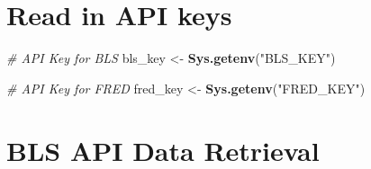 \documentclass[
]{article}
\newenvironment{Shaded}{\begin{snugshade}}{\end{snugshade}}
\newcommand{\CommentTok}[1]{\textcolor[rgb]{0.56,0.35,0.01}{\textit{#1}}}
\newcommand{\FunctionTok}[1]{\textcolor[rgb]{0.13,0.29,0.53}{\textbf{#1}}}
\newcommand{\NormalTok}[1]{#1}
\newcommand{\OtherTok}[1]{\textcolor[rgb]{0.56,0.35,0.01}{#1}}
\newcommand{\StringTok}[1]{\textcolor[rgb]{0.31,0.60,0.02}{#1}}
\begin{document}
\section{Read in API keys}\label{read-in-api-keys}

\begin{Shaded}
\begin{Highlighting}[]
\CommentTok{\# API Key for BLS }
\NormalTok{bls\_key }\OtherTok{\textless{}{-}} \FunctionTok{Sys.getenv}\NormalTok{(}\StringTok{"BLS\_KEY"}\NormalTok{)}

\CommentTok{\# API Key for FRED}
\NormalTok{fred\_key }\OtherTok{\textless{}{-}} \FunctionTok{Sys.getenv}\NormalTok{(}\StringTok{"FRED\_KEY"}\NormalTok{)}
\end{Highlighting}
\end{Shaded}

\section{BLS API Data Retrieval}\label{bls-api-data-retrieval}
\end{document}

